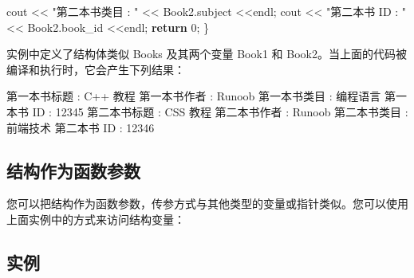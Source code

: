 \documentclass[
]{article}
\newenvironment{Shaded}{}{}
\newcommand{\ControlFlowTok}[1]{\textcolor[rgb]{0.00,0.44,0.13}{\textbf{#1}}}
\newcommand{\DecValTok}[1]{\textcolor[rgb]{0.25,0.63,0.44}{#1}}
\newcommand{\NormalTok}[1]{#1}
\newcommand{\OperatorTok}[1]{\textcolor[rgb]{0.40,0.40,0.40}{#1}}
\newcommand{\StringTok}[1]{\textcolor[rgb]{0.25,0.44,0.63}{#1}}
\begin{document}
\begin{Shaded}
\begin{Highlighting}[]
\NormalTok{   cout }\OperatorTok{\textless{}\textless{}} \StringTok{"第二本书类目 : "} \OperatorTok{\textless{}\textless{}}\NormalTok{ Book2}\OperatorTok{.}\NormalTok{subject }\OperatorTok{\textless{}\textless{}}\NormalTok{endl}\OperatorTok{;}   
\NormalTok{   cout }\OperatorTok{\textless{}\textless{}} \StringTok{"第二本书 ID : "} \OperatorTok{\textless{}\textless{}}\NormalTok{ Book2}\OperatorTok{.}\NormalTok{book\_id }\OperatorTok{\textless{}\textless{}}\NormalTok{endl}\OperatorTok{;} 
   \ControlFlowTok{return} \DecValTok{0}\OperatorTok{;}
\OperatorTok{\}}
\end{Highlighting}
\end{Shaded}

实例中定义了结构体类似 Books 及其两个变量 Book1 和
Book2。当上面的代码被编译和执行时，它会产生下列结果：

\begin{Shaded}
\begin{Highlighting}[]
\NormalTok{第一本书标题 }\OperatorTok{:}\NormalTok{ C}\OperatorTok{++}\NormalTok{ 教程}
\NormalTok{第一本书作者 }\OperatorTok{:}\NormalTok{ Runoob}
\NormalTok{第一本书类目 }\OperatorTok{:}\NormalTok{ 编程语言}
\NormalTok{第一本书 ID }\OperatorTok{:} \DecValTok{12345}
\NormalTok{第二本书标题 }\OperatorTok{:}\NormalTok{ CSS 教程}
\NormalTok{第二本书作者 }\OperatorTok{:}\NormalTok{ Runoob}
\NormalTok{第二本书类目 }\OperatorTok{:}\NormalTok{ 前端技术}
\NormalTok{第二本书 ID }\OperatorTok{:} \DecValTok{12346}
\end{Highlighting}
\end{Shaded}

\hypertarget{ux7ed3ux6784ux4f5cux4e3aux51fdux6570ux53c2ux6570}{%
\subsection{结构作为函数参数}\label{ux7ed3ux6784ux4f5cux4e3aux51fdux6570ux53c2ux6570}}

您可以把结构作为函数参数，传参方式与其他类型的变量或指针类似。您可以使用上面实例中的方式来访问结构变量：

\hypertarget{ux5b9eux4f8b-16}{%
\subsection{实例}\label{ux5b9eux4f8b-16}}
\end{document}
